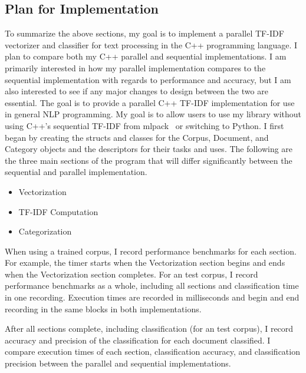 \documentclass[conference]{IEEEtran}
\begin{document}
\subsection{Plan for Implementation}
To summarize the above sections, my goal is to implement a parallel TF-IDF vectorizer and classifier for text processing in the C++ programming language. I plan to compare both my C++ parallel and sequential implementations. I am primarily interested in how my parallel implementation compares to the sequential implementation with regards to performance and accuracy, but I am also interested to see if any major changes to design between the two are essential. The goal is to provide a parallel C++ TF-IDF implementation for use in general NLP programming. My goal is to allow users to use my library without using C++’s sequential TF-IDF from mlpack~\cite{b3} or switching to Python. I first began by creating the structs and classes for the Corpus, Document, and Category objects and the descriptors for their tasks and uses. The following are the three main sections of the program that will differ significantly between the sequential and parallel implementation.

\begin{itemize}
    \item Vectorization
    \item TF-IDF Computation
    \item Categorization
\end{itemize}

When using a trained corpus, I record performance benchmarks for each section. For example, the timer starts when the Vectorization section begins and ends when the Vectorization section completes. For an test corpus, I record performance benchmarks as a whole, including all sections and classification time in one recording. Execution times are recorded in milliseconds and begin and end recording in the same blocks in both implementations.

After all sections complete, including classification (for an test corpus), I record accuracy and precision of the classification for each document classified. I compare execution times of each section, classification accuracy, and classification precision between the parallel and sequential implementations. 
\end{document}
